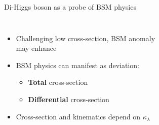 \begin{frame}{Di-Higgs boson as a probe of BSM physics}

\begin{columns}
\begin{itemize}
    \item Challenging low cross-section, BSM anomaly may enhance
    \item BSM physics can manifest as deviation:
    \begin{itemize}
        \item \textbf{\textcolor{HHred}{Total}} cross-section
        \item \textbf{\textcolor{HHturquoise_m}{Differential}} cross-section
    \end{itemize}
    \item Cross-section and kinematics depend on $\kappa_{\lambda}$ 
\end{itemize}


\begin{figure}
    \centering
\end{figure}

\begin{figure}
    \centering
\end{figure}


\end{columns}
\end{frame}
